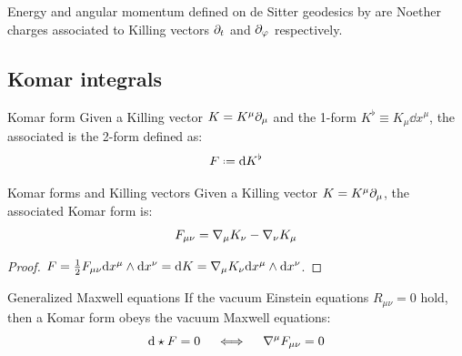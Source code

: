 \begin{example}{}{}
  Energy and angular momentum defined on de Sitter geodesics by  are Noether charges associated to Killing vectors $ \partial_t $ and $ \partial_\varphi $ respectively.
\end{example}

\subsection{Komar integrals}

\begin{definition}{Komar form}{}
  Given a Killing vector $ K = K^\mu \partial_\mu $ and the 1-form $ K^\flat \equiv K_\mu \dd x^\mu $, the associated  is the 2-form defined as:
  \begin{equation}
    F \defeq \dd K^\flat
  \end{equation}
\end{definition}

\begin{proposition}{Komar forms and Killing vectors}{}
  Given a Killing vector $ K = K^\mu \partial_\mu $, the associated Komar form is:
  \begin{equation}
    F_{\mu \nu} = \nabla_\mu K_\nu - \nabla_\nu K_\mu
  \end{equation}
\end{proposition}

\begin{proofbox}
  \begin{proof}
    $ F = \frac{1}{2} F_{\mu \nu} \mathrm{d} x^\mu \wedge \mathrm{d} x^\nu = \mathrm{d} K = \nabla_\mu K_\nu \mathrm{d} x^\mu \wedge \mathrm{d} x^\nu $.
  \end{proof}
\end{proofbox}

\begin{theorem}{Generalized Maxwell equations}{}
  If the vacuum Einstein equations $ R_{\mu \nu} = 0 $ hold, then a Komar form obeys the vacuum Maxwell equations:
  \begin{equation}
    \mathrm{d} \star F = 0
    \quad \iff \quad
    \nabla^\mu F_{\mu \nu} = 0
    \label{eq:komar}
  \end{equation}
\end{theorem}

